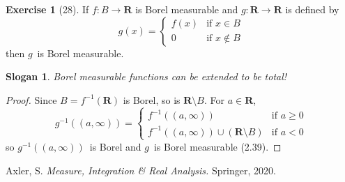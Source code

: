 \documentclass[letterpaper,12pt]{article}
\newcommand{\R}{\mathbf{R}}
\newcommand{\union}{\cup}
\newcommand{\inv}[1]{#1^{-1}}
\theoremstyle{definition}
\newtheorem*{exer}{Exercise}
\theoremstyle{remark}
\theoremstyle{plain}
\newtheorem*{slogan}{Slogan}
\begin{document}
\begin{exer}[28]
If \(f:B\to\R\) is Borel measurable and \(g:\R\to\R\) is defined by
\[g(x)=\begin{cases}
f(x)&\text{if }x\in B\\
0&\text{if }x\not\in B
\end{cases}\]
then \(g\)~is Borel measurable.
\end{exer}
\begin{slogan}
Borel measurable functions can be extended to be total!
\end{slogan}
\begin{proof}
Since \(B=\inv{f}(\R)\) is Borel, so is \(\R\setminus B\). For \(a\in\R\),
\[\inv{g}((a,\infty))=\begin{cases}
\inv{f}((a,\infty))&\text{if }a\ge0\\
\inv{f}((a,\infty))\union(\R\setminus B)&\text{if }a<0
\end{cases}\]
so \(\inv{g}((a,\infty))\)~is Borel and \(g\)~is Borel measurable (2.39).
\end{proof}

\newpage
\begin{thebibliography}{0}
 Axler, S. \textit{Measure, Integration \& Real Analysis.} Springer, 2020.
\end{thebibliography}
\end{document}
